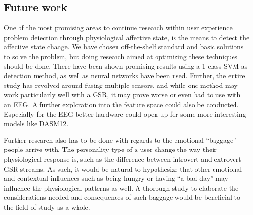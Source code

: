 \subsection{Future work}
One of the most promising areas to continue research within user experience problem detection through physiological affective state, is the means to detect the affective state change. 
We have chosen off-the-shelf standard and basic solutions to solve the problem, but doing research aimed at optimizing these techniques should be done. 
There have been shown promising results using a 1-class SVM as detection method, as well as neural networks have been used.
Further, the entire study has revolved around fusing multiple sensors, and while one method may work particularly well with a GSR, it may prove worse or even bad to use with an EEG. 
A further exploration into the feature space could also be conducted. 
Especially for the EEG better hardware could open up for some more interesting models like DASM12\cite{eeg_music_listening}. 

Further research also has to be done with regards to the emotional ``baggage'' people arrive with. 
The personality type of a user change the way their physiological response is, such as the difference between introvert and extrovert GSR streams. 
As such, it would be natural to hypothesize that other emotional and contextual influences such as being hungry or having ``a bad day'' may influence the physiological patterns as well. 
A thorough study to elaborate the considerations needed and consequences of such baggage would be beneficial to the field of study as a whole. 